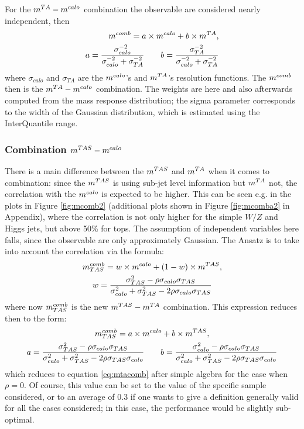 For the $m^{TA}-m^{calo}$ combination the observable are considered nearly independent, then
\begin{equation}\begin{split}
 m^{comb}= a\times m^{calo} + b \times m^{TA},\\
 a=\frac{\sigma_{calo}^{-2}}{\sigma_{calo}^{-2}+\sigma_{TA}^{-2}} \qquad b=\frac{\sigma_{TA}^{-2}}{\sigma_{calo}^{-2}+\sigma_{TA}^{-2}}
\end{split}
\label{eq:mtacomb}
\end{equation}
where $\sigma_{calo}$ and $\sigma_{TA}$ are the $m^{calo}$'s and $m^{TA}$'s resolution functions. The $m^{comb}$ then is the $m^{TA}-m^{calo}$ combination.
The weights are here and also afterwards computed from the mass response distribution; the sigma parameter corresponds to the width of the Gaussian distribution, which is estimated using the InterQuantile range. 

\subsubsection{Combination $m^{TAS}-m^{calo}$ }

There is a main difference between the $m^{TAS}$ and $m^{TA}$ when it comes to combination: since the $m^{TAS}$ is using sub-jet level information but $m^{TA}$ not, the correlation with the $m^{calo}$ is expected to be higher.
This can be seen e.g. in the plots in Figure \ref{fig:mcomb2} (additional plots shown in Figure \ref{fig:mcomba2} in Appendix), where the correlation is not only higher for the simple $W/Z$ and Higgs jets, but above 50\% for tops. The assumption of independent variables here falls, since the observable are only approximately Gaussian. The Ansatz is to take into account the correlation via the formula:
\begin{equation}
\begin{gathered}
m^{comb}_{TAS}= w\times m^{calo} + (1-w)\times m^{TAS},\\
w=\frac{\sigma_{TAS}^2-\rho\sigma_{calo}\sigma_{TAS}}{\sigma_{calo}^2+\sigma_{TAS}^2-2\rho\sigma_{calo}\sigma_{TAS}}
\end{gathered}
\label{eq:mtascomb}
\end{equation}
% 
where now $m^{comb}_{TAS}$ is the new $m^{TAS}-m^{TA}$ combination. This expression reduces then to the form:
\begin{equation}
\begin{gathered}
m^{comb}_{TAS}= a\times m^{calo} + b\times m^{TAS},\\
a=\frac{\sigma_{TAS}^2-\rho\sigma_{calo}\sigma_{TAS}}{\sigma_{calo}^2+\sigma_{TAS}^2-2\rho\sigma_{TAS}\sigma_{calo}}\qquad b=\frac{\sigma_{calo}^2-\rho\sigma_{calo}\sigma_{TAS}}{\sigma_{calo}^2+\sigma_{TAS}^2-2\rho\sigma_{TAS}\sigma_{calo}}
\end{gathered}
\end{equation}
which reduces to equation \eqref{eq:mtacomb} after simple algebra for the case when $\rho=0$. Of course, this value can be set to the value of the specific sample considered, or to an average of 0.3 if one wants to give a definition generally valid for all the cases considered; in this case, the performance would be slightly sub-optimal.

